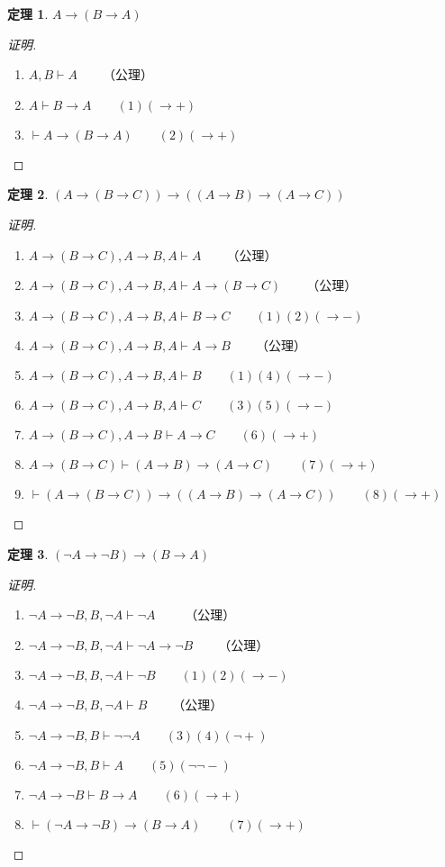 \documentclass{article}
\newtheorem{Thm}{定理}
\begin{document}
\begin{CJK*}{UTF8}{gbsn}
  \begin{Thm}$A\to (B\to A)$\end{Thm}
  \begin{proof}[证明]$\quad$
    \begin{enumerate}
      \item $ A,B \vdash A\qquad$（公理） 
      \item $ A\vdash B\to A\qquad (1)(\to +)$
      \item $ \vdash A\to (B\to A)\qquad (2)(\to +)$
    \end{enumerate}
  \end{proof}
  \begin{Thm}$(A\to (B\to C))\to ((A\to B)\to (A\to C))$\end{Thm}
  \begin{proof}[证明]$\quad$
    \begin{enumerate}
      \item $ A\to (B\to C), A\to B, A\vdash A\qquad$（公理） 
      \item $ A\to (B\to C), A\to B, A\vdash A\to (B\to C)\qquad$（公理） 
      \item $ A\to (B\to C), A\to B, A\vdash B\to C\qquad(1)(2)(\to -)$
      \item $ A\to (B\to C), A\to B, A\vdash A\to B\qquad$（公理）
      \item $ A\to (B\to C), A\to B, A\vdash B\qquad(1)(4)(\to -)$
      \item $ A\to (B\to C), A\to B, A\vdash C\qquad(3)(5)(\to -)$
      \item $ A\to (B\to C), A\to B\vdash A\to C\qquad(6)(\to +)$ 
      \item $  A\to (B\to C)\vdash(A\to B)\to(A\to C)\qquad(7)(\to +)$
      \item $ \vdash (A\to (B\to C))\to ((A\to B)\to (A\to C))\qquad(8)(\to +)$
    \end{enumerate}
  \end{proof}
  \begin{Thm}$(\lnot A\to \lnot B)\to (B\to A)$\end{Thm}
  \begin{proof}[证明]$\quad$
    \begin{enumerate}
      \item $\lnot A\to \lnot B, B, \lnot A \vdash \lnot A \qquad$ （公理）
      \item $ \lnot A\to \lnot B, B, \lnot A \vdash \lnot A\to \lnot B\qquad$（公理）
      \item $ \lnot A\to \lnot B, B, \lnot A \vdash \lnot B\qquad (1)(2)(\to -)$
      \item $ \lnot A\to \lnot B, B, \lnot A \vdash B\qquad$（公理）
      \item $ \lnot A\to \lnot B, B\vdash \lnot\lnot A\qquad (3)(4)(\lnot +)$
      \item $ \lnot A\to \lnot B, B\vdash A\qquad (5)(\lnot\lnot -)$
      \item $ \lnot A\to \lnot B\vdash B\to A\qquad (6)(\to +)$ 
      \item $ \vdash (\lnot A\to \lnot B)\to (B\to A)\qquad (7)(\to +)$
    \end{enumerate}
  \end{proof}


\end{CJK*}
\end{document}
